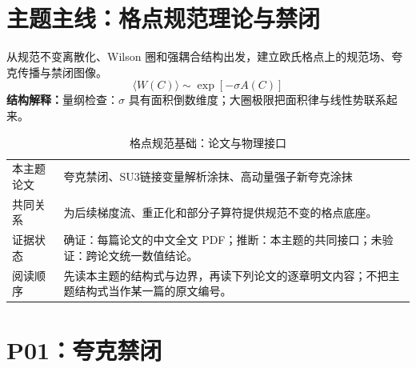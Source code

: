 \documentclass[UTF8,11pt,oneside]{ctexbook}
\begin{document}
\chapter*{主题主线：格点规范理论与禁闭}
从规范不变离散化、Wilson 圈和强耦合结构出发，建立欧氏格点上的规范场、夸克传播与禁闭图像。
\begin{equation}
  \langle W(C)\rangle\sim\exp[-\sigma A(C)]
\end{equation}
\noindent\textbf{结构解释：}量纲检查：$\sigma$ 具有面积倒数维度；大圈极限把面积律与线性势联系起来。
\begin{table}[htbp]
  \centering
  \caption{格点规范基础：论文与物理接口}
  \small
  \begin{tabularx}{0.96\textwidth}{@{}p{3.3cm}>{\raggedright\arraybackslash}X@{}}
    \toprule
    本主题论文 & 夸克禁闭、SU3链接变量解析涂抹、高动量强子新夸克涂抹 \\
    共同关系 & 为后续梯度流、重正化和部分子算符提供规范不变的格点底座。 \\
    证据状态 & 确证：每篇论文的中文全文 PDF；推断：本主题的共同接口；未验证：跨论文统一数值结论。 \\
    阅读顺序 & 先读本主题的结构式与边界，再读下列论文的逐章明文内容；不把主题结构式当作某一篇的原文编号。 \\
    \bottomrule
  \end{tabularx}
\end{table}

\chapter{P01：夸克禁闭}
\end{document}
